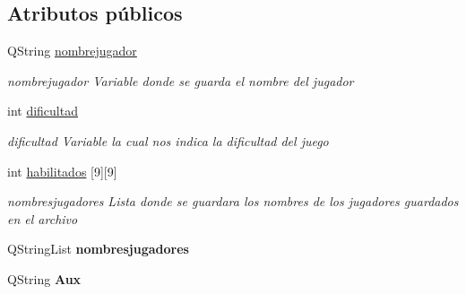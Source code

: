 \subsection*{Atributos públicos}
\begin{DoxyCompactItemize}
\item 
\hypertarget{class_q_tablero_ab6988e6aa07336dc639688ef420f0b10}{Q\-String \hyperlink{class_q_tablero_ab6988e6aa07336dc639688ef420f0b10}{nombrejugador}}\label{class_q_tablero_ab6988e6aa07336dc639688ef420f0b10}

\begin{DoxyCompactList}\small\item\em nombrejugador Variable donde se guarda el nombre del jugador \end{DoxyCompactList}\item 
\hypertarget{class_q_tablero_a0bd584d1e208a5212d402b30740d4cea}{int \hyperlink{class_q_tablero_a0bd584d1e208a5212d402b30740d4cea}{dificultad}}\label{class_q_tablero_a0bd584d1e208a5212d402b30740d4cea}

\begin{DoxyCompactList}\small\item\em dificultad Variable la cual nos indica la dificultad del juego \end{DoxyCompactList}\item 
\hypertarget{class_q_tablero_a7e9922b23c74a607365be5bdc0972810}{int \hyperlink{class_q_tablero_a7e9922b23c74a607365be5bdc0972810}{habilitados} \mbox{[}9\mbox{]}\mbox{[}9\mbox{]}}\label{class_q_tablero_a7e9922b23c74a607365be5bdc0972810}

\begin{DoxyCompactList}\small\item\em nombresjugadores Lista donde se guardara los nombres de los jugadores guardados en el archivo \end{DoxyCompactList}\item 
\hypertarget{class_q_tablero_ae2bf33108036c5f76f04480aabda39cb}{Q\-String\-List {\bfseries nombresjugadores}}\label{class_q_tablero_ae2bf33108036c5f76f04480aabda39cb}

\item 
\hypertarget{class_q_tablero_a7f0335cb524444bd5806cd8336174f32}{Q\-String {\bfseries Aux}}\label{class_q_tablero_a7f0335cb524444bd5806cd8336174f32}

\end{DoxyCompactItemize}


